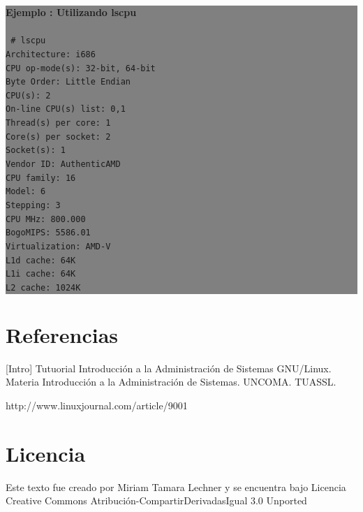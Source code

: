 \documentclass[12pt]{article}
\begin{document}
\colorbox{grey}{\parbox[t]{0.95\linewidth}{ \vspace*{0.5cm} { 
{\bf Ejemplo : Utilizando lscpu }
\\ \\
{\tt \small
\# lscpu \\
Architecture:          i686\\
CPU op-mode(s):        32-bit, 64-bit\\
Byte Order:            Little Endian\\
CPU(s):                2\\
On-line CPU(s) list:   0,1\\
Thread(s) per core:    1\\
Core(s) per socket:    2\\
Socket(s):             1\\
Vendor ID:             AuthenticAMD\\
CPU family:            16\\
Model:                 6\\
Stepping:              3\\
CPU MHz:               800.000\\
BogoMIPS:              5586.01\\
Virtualization:        AMD-V\\
L1d cache:             64K\\
L1i cache:             64K\\
L2 cache:              1024K\\
}
} \vspace*{0.5cm} } } 


\section*{Referencias}

[Intro] Tutuorial Introducción a la Administración de Sistemas GNU/Linux. Materia Introducción
a la Administración de Sistemas. UNCOMA. TUASSL. 

http://www.linuxjournal.com/article/9001


\section*{Licencia}

Este texto fue creado por Miriam Tamara Lechner y se encuentra bajo 
Licencia Creative Commons Atribución-CompartirDerivadasIgual 3.0 Unported
\end{document}
